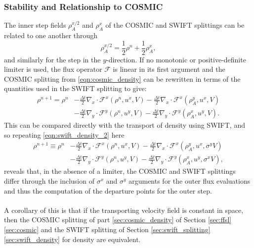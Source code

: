 \documentclass{ametsocV6.1}
\begin{document}
\subsubsection{Stability and Relationship to COSMIC}
The inner step fields $\rho_A^{x/2}$ and $\rho_A^{x}$ of the COSMIC and SWIFT splittings can be related to one another through
\begin{equation}
\rho_A^{x/2} = \frac{1}{2}\rho^n + \frac{1}{2}\rho_A^x,
\end{equation}
and similarly for the step in the $y$-direction.
If no monotonic or positive-definite limiter is used, the flux operator $\mathcal{F}$ is linear in its first argument and the COSMIC splitting from \eqref{eqn:cosmic_density} can be rewritten in terms of the quantities used in the SWIFT splitting to give:
\begin{equation} \label{eqn:cosmic_linear}
\begin{split}
\rho^{n+1} = \rho^n & - \frac{\Delta t}{2} \nabla_x\cdot \mathcal{F}^x(\rho^n, u^x,V) - \frac{\Delta{t}}{2} \nabla_x\cdot \mathcal{F}^x(\rho^y_A, u^x,V) \\
& - \frac{\Delta{t}}{2} \nabla_y\cdot \mathcal{F}^y(\rho^n, u^y,V) - \frac{\Delta{t}}{2} \nabla_y\cdot \mathcal{F}^y(\rho^x_A, u^y,V).
\end{split}
\end{equation}
This can be compared directly with the transport of density using SWIFT, and so repeating \eqref{eqn:swift_density_2} here
\begin{equation}
\begin{split}
\rho^{n+1} \equiv \rho^n & - \frac{\Delta t}{2} \nabla_x\cdot \mathcal{F}^x(\rho^n, u^x, V) - \frac{\Delta{t}}{2} \nabla_x\cdot \mathcal{F}^x(\rho^y_A, u^x, \sigma^yV) \\
& - \frac{\Delta{t}}{2} \nabla_y\cdot \mathcal{F}^y(\rho^n, u^y,V) - \frac{\Delta{t}}{2} \nabla_y\cdot \mathcal{F}^y(\rho^x_A, u^y, \sigma^xV),
\end{split}
\end{equation}
reveals that, in the absence of a limiter, the COSMIC and SWIFT splittings differ through the inclusion of $\sigma^x$ and $\sigma^y$ arguments for the outer flux evaluations and thus the computation of the departure points for the outer step.
\\
\\
A corollary of this is that if the transporting velocity field is constant in space, then the COSMIC splitting of part \ref{sec:cosmic_density} of Section \ref{sec:ffsl}\ref{sec:cosmic} and the SWIFT splitting of Section \ref{sec:swift_splitting}\ref{sec:swift_density} for density are equivalent.
\end{document}
